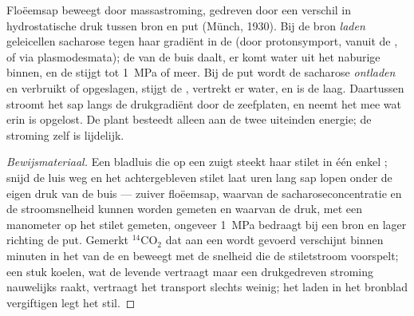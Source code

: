 \begin{theorem}[Drukstroming]\label{thm:b1:plant-transport:pressureflow}
Floëemsap beweegt door massastroming, gedreven door een verschil in
hydrostatische druk tussen bron en put (Münch, 1930). Bij de bron
\emph{laden} geleicellen sacharose tegen haar gradiënt in de  (door
protonsymport, vanuit de , of via plasmodesmata); de 
van de buis daalt, er komt water uit het naburige  binnen, en de
 stijgt tot \qty{1}{MPa} of meer. Bij de put wordt de sacharose
\emph{ontladen} en verbruikt of opgeslagen, stijgt de ,
vertrekt er water, en is de  laag. Daartussen stroomt het sap langs de
drukgradiënt door de zeefplaten, en neemt het mee wat erin is opgelost. De
plant besteedt alleen aan de twee uiteinden energie; de stroming zelf is
lijdelijk.
\end{theorem}
\begin{proof}[Bewijsmateriaal]
Een bladluis die op een  zuigt steekt haar stilet in één enkel
; snijd de luis weg en het achtergebleven stilet laat uren lang sap
lopen onder de eigen druk van de buis --- zuiver floëemsap, waarvan de
sacharoseconcentratie en de stroomsnelheid kunnen worden gemeten en waarvan
de druk, met een manometer op het stilet gemeten, ongeveer \qty{1}{MPa}
bedraagt bij een bron en lager richting de put. Gemerkt
$\mathrm{^{14}CO_2}$ dat aan een  wordt gevoerd verschijnt binnen
minuten in het  van de  en beweegt met de snelheid die de
stiletstroom voorspelt; een stuk  koelen, wat de levende 
vertraagt maar een drukgedreven stroming nauwelijks raakt, vertraagt het
transport slechts weinig; het laden in het bronblad vergiftigen legt het
stil.
\end{proof}

